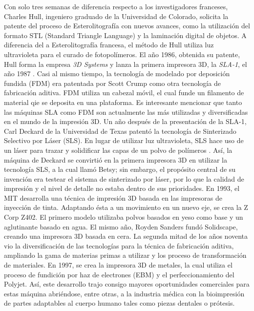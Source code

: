 Con solo tres semanas de diferencia respecto a los investigadores franceses, Charles Hull, ingeniero graduado de la Universidad de Colorado, solicita la patente del proceso de Esterolitografía con nuevos avances, como la utilización del formato STL (Standard Triangle Language) y la laminación digital de objetos. A diferencia del a Esterolitografía francesa, el método de Hull utiliza luz ultravioleta para el curado de fotopolímeros. El año 1986, obtenida su patente, Hull forma la empresa \textit{3D Systems} y lanza la primera impresora 3D, la \textit{SLA-1}, el año 1987 \citep{tresdsourced2020}. Casi al mismo tiempo, la tecnología de modelado por deposición fundida (FDM) era patentada por Scott Crump como otra tecnología de fabricación aditiva\citep{alltresdp2018}. FDM utiliza un cabezal móvil, el cual funde un filamento de material qie se deposita en una plataforma. Es interesante mencionar que tanto las máquinas SLA como FDM son actualmente las más utilizadas y diversificadas en el mundo de la impresión 3D.
Un año después de la presentación de la SLA-1, Carl Deckard de la Universidad de Texas patentó la tecnología de Sinterizado Selectivo por Láser (SLS). En lugar de utilizar luz ultravioleta, SLS hace uso de un láser para trazar y solidificar las capas de un polvo de polímeros \citep{tresdsourced2020}. Así, la máquina de Deckard se convirtió en la primera impresora 3D en utilizar la tecnología SLS, a la cual llamó Betsy; sin embargo, el propósito central de su invención era testear el sistema de sinterizado por láser, por lo que la calidad de impresión y el nivel de detalle no estaba dentro de sus prioridades\citep{alltresdp2018}. 
En 1993, el MIT desarrolla una técnica de impresión 3D basada en las impresoras de inyección de tinta. Adaptando ésta a un movimiento en un nuevo eje, se crea la Z Corp Z402. El primero modelo utilizaba polvos basados en yeso como base y un aglutinante basado en agua. El mismo año, Royden Sanders fundó Solidscape, creando una impresora 3D basada en cera.
La segunda mitad de los años noventa vio la diversificación de las tecnologías para la técnica de fabricación aditiva, ampliando la gama de materias primas a utilizar y los proceso de transformación de materiales. En 1997, se crea la impresora 3D de metales, la cual utiliza el proceso de fundición por haz de electrones (EBM) y el perfeccionamiento del Polyjet. Así, este desarrollo trajo consigo mayores oportunidades comerciales para estas máquina abriéndose, entre otras, a la industria médica con la bioimpresión de partes adaptables al cuerpo humano tales como piezas dentales o prótesis\citep{tresdsourced2020}.
